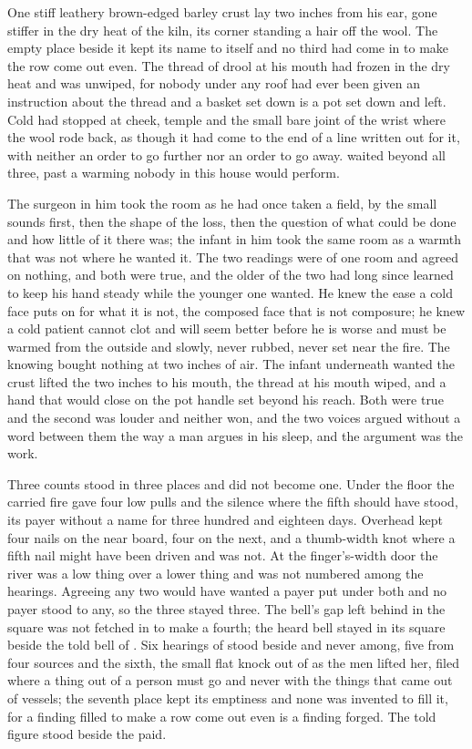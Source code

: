 One stiff leathery brown-edged barley crust lay two inches from his ear, gone stiffer in the dry heat of the kiln, its corner standing a hair off the wool. The empty place beside it kept its name to itself and no third had come in to make the row come out even. The thread of drool at his mouth had frozen in the dry heat and was unwiped, for nobody under any roof had ever been given an instruction about the thread and a basket set down is a pot set down and left. Cold had stopped at cheek, temple and the small bare joint of the wrist where the wool rode back, as though it had come to the end of a line written out for it, with neither an order to go further nor an order to go away.  waited beyond all three, past a warming nobody in this house would perform.

The surgeon in him took the room as he had once taken a field, by the small sounds first, then the shape of the loss, then the question of what could be done and how little of it there was; the infant in him took the same room as a warmth that was not where he wanted it. The two readings were of one room and agreed on nothing, and both were true, and the older of the two had long since learned to keep his hand steady while the younger one wanted. He knew the ease a cold face puts on for what it is not, the composed face that is not composure; he knew a cold patient cannot clot and will seem better before he is worse and must be warmed from the outside and slowly, never rubbed, never set near the fire. The knowing bought nothing at two inches of air. The infant underneath wanted the crust lifted the two inches to his mouth, the thread at his mouth wiped, and a hand that would close on the pot handle set beyond his reach. Both were true and the second was louder and neither won, and the two voices argued without a word between them the way a man argues in his sleep, and the argument was the work.

\scenebreak

Three counts stood in three places and did not become one. Under the floor the carried fire gave four low pulls and the silence where the fifth should have stood, its payer without a name for three hundred and eighteen days. Overhead  kept four nails on the near board, four on the next, and a thumb-width knot where a fifth nail might have been driven and was not. At the finger's-width door the river was a low thing over a lower thing and was not numbered among the hearings. Agreeing any two would have wanted a payer put under both and no payer stood to any, so the three stayed three. The bell's gap left behind in the square was not fetched in to make a fourth; the heard bell stayed in its square beside the told bell of . Six hearings of  stood beside and never among, five from four sources and the sixth, the small flat knock out of  as the men lifted her, filed where a thing out of a person must go and never with the things that came out of vessels; the seventh place kept its emptiness and none was invented to fill it, for a finding filled to make a row come out even is a finding forged. The told figure stood beside the paid.

